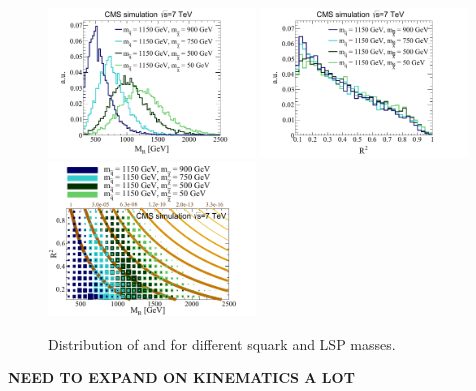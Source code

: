 \begin{figure}[thb!]
\centering
\includegraphics[width=0.49\textwidth]{figs/theory/MR_T2_pheno.pdf}
\includegraphics[width=0.49\textwidth]{figs/theory/RSQ_T2_pheno.pdf}\\
\includegraphics[width=0.49\textwidth]{figs/theory/MR_T2_R2_pheno.pdf}
\caption{Distribution of \Rtwo and \MR for different squark and LSP masses.\label{fig:T2RsqMR}}
\end{figure}

\textbf{NEED TO EXPAND ON KINEMATICS A LOT}
